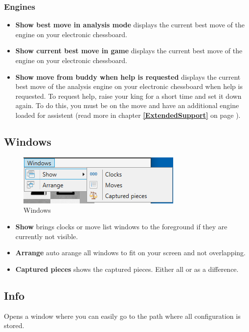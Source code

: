 \documentclass[11pt,a4paper]{article}
\begin{document}
\subsubsection{Engines}
\begin{itemize}
   \item \textbf{Show best move in analysis mode} displays the current best move of the engine on your electronic chessboard.
	\item \textbf{Show current best move in game} displays the current best move of the engine on your electronic chessboard.	
	\item \textbf{Show move from buddy when help is requested} displays the current best move of the analysis engine on your electronic chessboard when help is requested. To request help, raise your king for a short time and set it down again. To do this, you must be on the move and have an additional engine loaded for assistent (read more in chapter \textbf{\ref{ExtendedSupport}  } on page \pageref{ExtendedSupport}).
\end{itemize}

\subsection{Windows}
\begin{figure}[H]
	\centering
	\includegraphics[scale=1.0]{Windows.png}
	\caption{Windows}
	\label{fig:Windows}
\end{figure}
\begin{itemize}
	\item \textbf{Show} brings clocks or move list windows to the foreground if they are currently not visible.
	\item \textbf{Arrange} auto arange all windows to fit on your screen and not overlapping.
	\item \textbf{Captured pieces} shows the captured pieces. Either all or as a difference. 
\end{itemize}

\subsection{Info}
Opens a window where you can easily go to the path where all configuration is stored.
\end{document}
